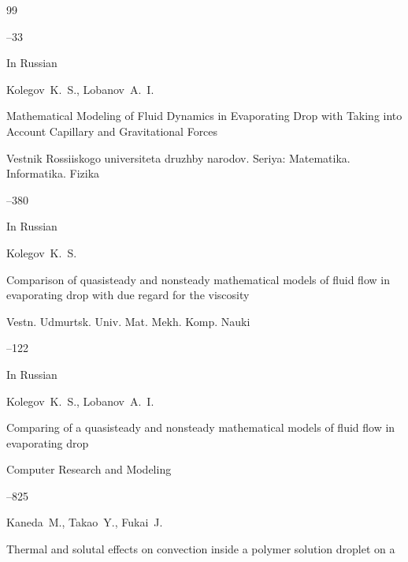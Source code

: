 \begin{thebibliography}{99}



--33





\lang In Russian

\by Kolegov~K.~S., Lobanov~A.~I.

\paper  Mathematical Modeling of Fluid Dynamics in Evaporating Drop with Taking into Account Capillary and Gravitational Forces

\jour Vestnik Rossiiskogo universiteta druzhby narodov. Seriya: Matematika. Informatika. Fizika



--380




\lang In Russian

\by Kolegov~K.~S.

\paper Comparison of quasisteady and nonsteady mathematical models of fluid flow in evaporating drop with due regard for the viscosity

\jour Vestn. Udmurtsk. Univ. Mat. Mekh. Komp. Nauki



--122





\lang In Russian

\by Kolegov~K.~S., Lobanov~A.~I.

\paper Comparing of a quasisteady and nonsteady mathematical models of fluid flow in evaporating drop 

\jour Computer Research and Modeling




--825 




\by Kaneda~M., Takao~Y., Fukai~J.

\paper  Thermal and solutal effects on convection inside a polymer solution droplet on a


\end{thebibliography}

